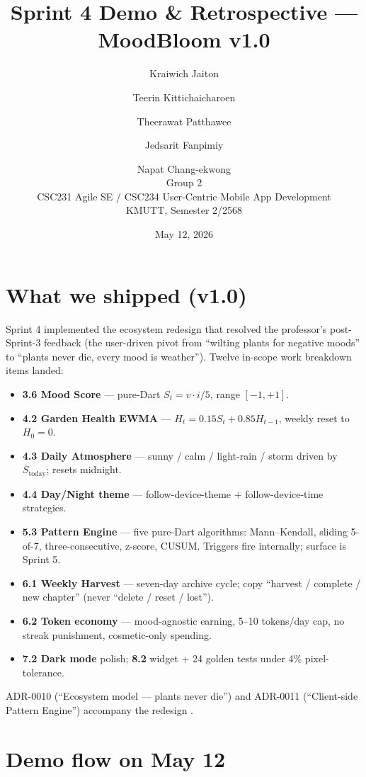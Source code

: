 \documentclass[11pt,a4paper]{article}
\title{Sprint 4 Demo \& Retrospective --- MoodBloom v1.0}
\author{
  Kraiwich Jaiton \and
  Teerin Kittichaicharoen \and
  Theerawat Patthawee \and
  Jedsarit Fanpimiy \and
  Napat Chang-ekwong \\[1ex]
  \small Group 2 \\
  \small CSC231 Agile SE / CSC234 User-Centric Mobile App Development \\
  \small KMUTT, Semester 2/2568
}
\date{May 12, 2026}
\begin{document}
\maketitle
\thispagestyle{empty}
\newpage

\section{What we shipped (v1.0)}

Sprint 4 implemented the ecosystem redesign that resolved the professor's
post-Sprint-3 feedback (the user-driven pivot from ``wilting plants for
negative moods'' to ``plants never die, every mood is weather''). Twelve
in-scope work breakdown items landed:

\begin{itemize}[leftmargin=*]
\item \textbf{3.6 Mood Score} --- pure-Dart $S_t = v \cdot i/5$, range $[-1, +1]$.
\item \textbf{4.2 Garden Health EWMA} --- $H_t = 0.15 S_t + 0.85 H_{t-1}$, weekly reset to $H_0 = 0$.
\item \textbf{4.3 Daily Atmosphere} --- sunny / calm / light-rain / storm driven by $\overline{S}_{\text{today}}$; resets midnight.
\item \textbf{4.4 Day/Night theme} --- follow-device-theme + follow-device-time strategies.
\item \textbf{5.3 Pattern Engine} --- five pure-Dart algorithms: Mann--Kendall, sliding 5-of-7, three-consecutive, z-score, CUSUM. Triggers fire internally; surface is Sprint 5.
\item \textbf{6.1 Weekly Harvest} --- seven-day archive cycle; copy ``harvest / complete / new chapter'' (never ``delete / reset / lost'').
\item \textbf{6.2 Token economy} --- mood-agnostic earning, 5--10 tokens/day cap, no streak punishment, cosmetic-only spending.
\item \textbf{7.2 Dark mode} polish; \textbf{8.2} widget + 24 golden tests under 4\% pixel-tolerance.
\end{itemize}

ADR-0010 (``Ecosystem model --- plants never die'') and ADR-0011 (``Client-side
Pattern Engine'') accompany the redesign \autocite{neff2003selfcompassion,linehan1993dbt,hayes1999act,white1990narrative,smit2022ewma}.

\section{Demo flow on May 12}
\end{document}

